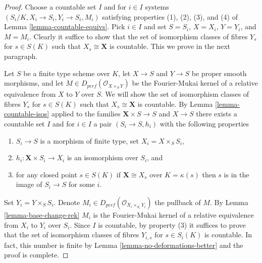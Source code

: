 \documentclass{stacks-project}
\theoremstyle{plain}
\theoremstyle{definition}
\theoremstyle{remark}
\numberwithin{equation}{subsection}
\begin{document}
\begin{proof}
Choose a countable set $I$ and for $i \in I$ systems
$(S_i/K, X_i \to S_i, Y_i \to S_i, M_i)$ satisfying properties
(1), (2), (3), and (4) of Lemma \ref{lemma-countable-equivs}.
Pick $i \in I$ and set $S = S_i$, $X = X_i$, $Y = Y_i$, and
$M = M_i$. Clearly it suffice to show that
the set of isomorphism classes of fibres $Y_s$ for $s \in S(K)$
such that $X_s \cong \mathbf{X}$ is countable.
This we prove in the next paragraph.

\medskip\noindent
Let $S$ be a finite type scheme over $K$, let $X \to S$ and $Y \to S$
be proper smooth morphisms, and let $M \in D_{perf}(\mathcal{O}_{X \times_S Y})$
be the Fourier-Mukai kernel of a relative equivalence from $X$
to $Y$ over $S$. We will show
the set of isomorphism classes of fibres $Y_s$ for $s \in S(K)$
such that $X_s \cong \mathbf{X}$ is countable.
By Lemma \ref{lemma-countable-isos} applied
to the families $\mathbf{X} \times S \to S$ and $X \to S$
there exists a countable set $I$ and for $i \in I$ a pair
$(S_i \to S, h_i)$ with the following properties
\begin{enumerate}
\item $S_i \to S$ is a morphism of finite type, set
$X_i = X \times_S S_i$,
\item $h_i : \mathbf{X} \times S_i \to X_i$
is an isomorphism over $S_i$, and
\item for any closed point $s \in S(K)$ if $\mathbf{X} \cong X_s$
over $K = \kappa(s)$ then $s$ is in the image of $S_i \to S$
for some $i$.
\end{enumerate}
Set $Y_i = Y \times_S S_i$. Denote
$M_i \in D_{perf}(\mathcal{O}_{X_i \times_{S_i} Y_i})$
the pullback of $M$. By Lemma \ref{lemma-base-change-rek}
$M_i$ is the Fourier-Mukai kernel of a relative equivalence from
$X_i$ to $Y_i$ over $S_i$. Since $I$ is countable, by
property (3) it suffices to prove that
the set of isomorphism classes of fibres $Y_{i, s}$ for $s \in S_i(K)$
is countable.
In fact, this number is finite by
Lemma \ref{lemma-no-deformations-better}
and the proof is complete.
\end{proof}











\end{document}
